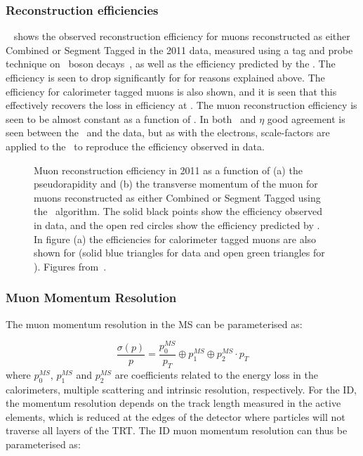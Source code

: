 \subsubsection{Reconstruction efficiencies}

~ shows the observed reconstruction efficiency for muons
reconstructed as either Combined or Segment Tagged in the 2011 data, measured
using a tag and probe technique on \Z\ boson decays~\cite{ATLAS-CONF-2011-063},
as well as the efficiency predicted by the \mcsim. The
efficiency is seen to drop significantly for  for reasons
explained above. The efficiency for calorimeter tagged muons is also shown, and
it is seen that this effectively recovers the loss in efficiency at
. The muon reconstruction efficiency is seen to be almost constant
as a function of \pt. In both \pt\ and $\eta$ good agreement is seen between the
\mcsim\ and the data, but as with the electrons, scale-factors are applied to
the \mc\ to reproduce the efficiency observed in data.

\begin{figure}[h]
\centering
    \caption[Muon reconstruction efficiency in 2011 as a function of the
    pseudorapidity and the transverse momentum of the muon.]{Muon
    reconstruction efficiency in 2011 as a function of (a) the pseudorapidity and
    (b) the transverse momentum of the muon for muons reconstructed as either
    Combined or Segment Tagged using the \staco\ algorithm. The solid black points
    show the efficiency observed in data, and the open red circles show the
    efficiency predicted by \mcsim. In figure (a) the efficiencies
    for calorimeter tagged muons are also shown for  (solid blue
    triangles for data and open green triangles for \mc). Figures
    from~\cite{MuonEfficiency2011}.} 
    \label{fig:mu-reco-eff} 
\end{figure}


\subsubsection{Muon Momentum Resolution}

The muon momentum resolution in the MS can be parameterised as:

\begin{equation}
\frac{ \sigma (p) }{ p } = \frac{ p_{0}^{MS} }{ p_{T} } \oplus  p_{1}^{MS}
\oplus  p_{2}^{MS} \cdot p_{T}
\end{equation}
where $p_{0}^{MS}$, $p_{1}^{MS}$ and $p_{2}^{MS}$ are coefficients related to
the energy loss in the calorimeters, multiple scattering and intrinsic
resolution, respectively. For the ID, the momentum resolution depends on the
track length measured in the active elements, which is reduced at the edges of
the detector where particles will not traverse all layers of the TRT. The ID
muon momentum resolution can thus be parameterised as:


